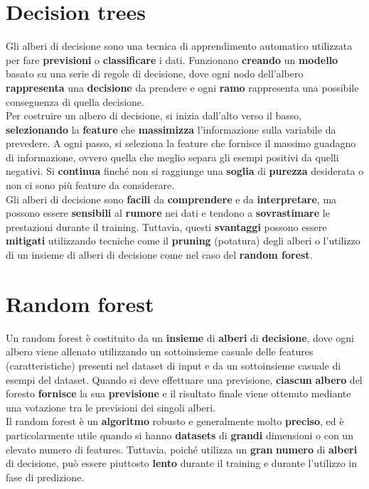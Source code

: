 \documentclass{article}
\begin{document}
\section{Decision trees}
Gli alberi di decisione sono una tecnica di apprendimento automatico utilizzata per fare \textbf{previsioni} o \textbf{classificare} i dati. Funzionano \textbf{creando} un \textbf{modello} basato su una serie di regole di decisione, dove ogni nodo dell'albero \textbf{rappresenta} una \textbf{decisione} da prendere e ogni \textbf{ramo} rappresenta una possibile conseguenza di quella decisione.
\\
Per costruire un albero di decisione, si inizia dall'alto verso il basso, \textbf{selezionando} la \textbf{feature} che \textbf{massimizza} l'informazione sulla variabile da prevedere. A ogni passo, si seleziona la feature che fornisce il massimo guadagno di informazione, ovvero quella che meglio separa gli esempi positivi da quelli negativi. Si \textbf{continua} finché non si raggiunge una \textbf{soglia} di \textbf{purezza} desiderata o non ci sono più feature da considerare.
\\
Gli alberi di decisione sono \textbf{facili} da \textbf{comprendere} e da \textbf{interpretare}, ma possono essere \textbf{sensibili} al \textbf{rumore} nei dati e tendono a \textbf{sovrastimare} le prestazioni durante il training. Tuttavia, questi \textbf{svantaggi} possono essere \textbf{mitigati} utilizzando tecniche come il \textbf{pruning} (potatura) degli alberi o l'utilizzo di un insieme di alberi di decisione come nel caso del \textbf{random forest}.

\section{Random forest}
Un random forest è costituito da un \textbf{insieme} di \textbf{alberi} di \textbf{decisione}, dove ogni albero viene allenato utilizzando un sottoinsieme casuale delle features (caratteristiche) presenti nel dataset di input e da un sottoinsieme casuale di esempi del dataset. Quando si deve effettuare una previsione, \textbf{ciascun} \textbf{albero} del foresto \textbf{fornisce} la sua \textbf{previsione} e il risultato finale viene ottenuto mediante una votazione tra le previsioni dei singoli alberi.
\\
Il random forest è un \textbf{algoritmo} robusto e generalmente molto \textbf{preciso}, ed è particolarmente utile quando si hanno \textbf{datasets} di \textbf{grandi} dimensioni o con un elevato numero di features. Tuttavia, poiché utilizza un \textbf{gran} \textbf{numero} di \textbf{alberi} di decisione, può essere piuttosto \textbf{lento} durante il training e durante l'utilizzo in fase di predizione.
\end{document}
